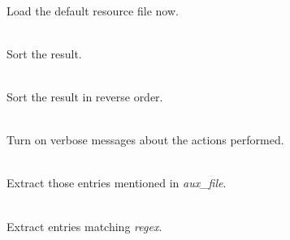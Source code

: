 \documentclass[a4paper]{article}
\newenvironment{FlatList}{\begin{list}{}{%
      \topsep=0pt\itemsep=0pt\parsep=0pt\let\makelabel=\flatlistlabel}}{\end{list}}%
\newcommand\flatlistlabel[1]{\descriptionlabel{\textsf{#1}}}
\newcommand\ARG[1]{\textsl{#1}}
\begin{document}
\begin{multicols}{4}
\begin{FlatList}
  \item [-R\ ]\ \\
    Load the default resource file now.
  \item [-s\ \ ]\ \\
    Sort the result.
  \item [-S\ ]\ \\
    Sort the result in reverse order.
  \item [-v\ \ ]\ \\
    Turn on verbose messages about the actions performed.
  \item [-x \ARG{aux\_file}]\ \\
    Extract those entries mentioned in \ARG{aux\_file}.
  \item [-X \ARG{regex}]\ \\
    Extract entries matching \ARG{regex}.
  \end{FlatList}
  \columnbreak


\end{multicols}
\end{document}
